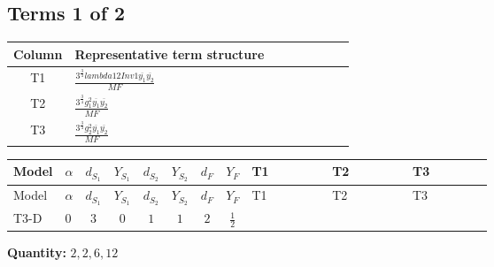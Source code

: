 \documentclass[8pt]{article}
\begin{document}
\begin{landscape}
\subsection*{Terms 1 of 2}
\begin{center}
\begin{tabular}{@{}c >{\raggedright\arraybackslash}p{0.82\linewidth}@{}}
\toprule
Column & Representative term structure \\
\midrule
T1 & \(\displaystyle \frac{3^{\frac{3}{4}} lambda12Inv1 \overline{y_{1}} \overline{y_{2}}}{MF}\) \\
\midrule
T2 & \(\displaystyle \frac{3^{\frac{3}{4}} g_{1}^{2} \overline{y_{1}} \overline{y_{2}}}{MF}\) \\
\midrule
T3 & \(\displaystyle \frac{3^{\frac{3}{4}} g_{2}^{2} \overline{y_{1}} \overline{y_{2}}}{MF}\) \\
\midrule
\bottomrule
\end{tabular}
\end{center}
\smallskip
\tiny
\begin{longtable}{@{}llcccccc >{\raggedright\arraybackslash}p{0.21\linewidth} >{\raggedright\arraybackslash}p{0.21\linewidth} >{\raggedright\arraybackslash}p{0.21\linewidth}@{}}
\toprule
Model & $\alpha$ & $d_{S_1}$ & $Y_{S_1}$ & $d_{S_2}$ & $Y_{S_2}$ & $d_F$ & $Y_F$ & T1 & T2 & T3 \\
\midrule
\endfirsthead
\toprule
Model & $\alpha$ & $d_{S_1}$ & $Y_{S_1}$ & $d_{S_2}$ & $Y_{S_2}$ & $d_F$ & $Y_F$ & T1 & T2 & T3 \\
\midrule
\endhead
T3-D & $0$ & $3$ & $0$ & $1$ & $1$ & $2$ & $\frac{1}{2}$ & \scriptsize\adjustbox{max width=\linewidth}{$\begin{gathered} \frac{3^{\frac{3}{4}} lambda12Inv1 \overline{y_{1}} \overline{y_{2}}}{6 MF}\end{gathered}$} & \scriptsize\adjustbox{max width=\linewidth}{$\begin{gathered} \frac{3^{\frac{3}{4}} g_{1}^{2} \overline{y_{1}} \overline{y_{2}}}{8 MF}\end{gathered}$} & \scriptsize\adjustbox{max width=\linewidth}{$\begin{gathered} \frac{11 \cdot 3^{\frac{3}{4}} g_{2}^{2} \overline{y_{1}} \overline{y_{2}}}{8 MF}\end{gathered}$} \\
\midrule
\bottomrule
\end{longtable}
\clearpage
\noindent\textbf{Quantity: }$\mathrm{2,2,6,12}$\par\smallskip

\end{landscape}
\end{document}

